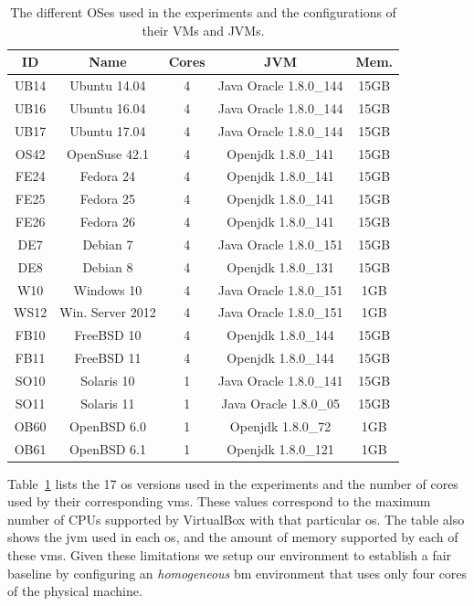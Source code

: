\begin{table}[h]
\begin{center}
{\footnotesize
\begin{tabular}{| c | c | c | c | c |}\hline
\textbf{ID} & \textbf{Name}  & \textbf{Cores} & \textbf{JVM} & \textbf{Mem.} \\\hline\hline
UB14 & Ubuntu 14.04 & 4 & Java Oracle 1.8.0\_144 & 15GB \\ \hline
UB16 & Ubuntu 16.04 & 4 & Java Oracle 1.8.0\_144 & 15GB \\ \hline
UB17 & Ubuntu 17.04 & 4 & Java Oracle 1.8.0\_144 & 15GB \\ \hline
OS42 & OpenSuse 42.1 & 4 & Openjdk 1.8.0\_141 & 15GB \\ \hline
FE24 & Fedora 24 & 4 & Openjdk 1.8.0\_141 & 15GB \\ \hline
FE25 & Fedora 25 & 4 & Openjdk 1.8.0\_141 & 15GB \\ \hline
FE26 & Fedora 26 & 4 & Openjdk 1.8.0\_141 & 15GB \\ \hline
DE7 & Debian 7 & 4 & Java Oracle 1.8.0\_151 & 15GB \\ \hline
DE8 & Debian 8 & 4 & Openjdk 1.8.0\_131 & 15GB \\ \hline
W10 & Windows 10 & 4 & Java Oracle 1.8.0\_151 &1GB \\ \hline
WS12 & Win. Server 2012 & 4 & Java Oracle 1.8.0\_151 & 1GB \\ \hline
FB10 & FreeBSD 10 & 4 & Openjdk 1.8.0\_144 & 15GB \\ \hline
FB11 & FreeBSD 11 & 4 & Openjdk 1.8.0\_144 & 15GB \\ \hline
SO10 & Solaris 10 & 1 & Java Oracle 1.8.0\_141 & 15GB \\ \hline
SO11 & Solaris 11 & 1 & Java Oracle 1.8.0\_05 & 15GB \\ \hline
OB60 & OpenBSD 6.0 & 1 & Openjdk 1.8.0\_72 & 1GB \\ \hline
OB61 & OpenBSD 6.1 & 1 & Openjdk 1.8.0\_121 & 1GB \\ \hline
\end{tabular}
}
\caption{The different OSes used in the experiments and the configurations of their VMs and JVMs.}
\label{tab:oses}
\end{center}
\end{table}

Table~\ref{tab:oses} lists the 17 \gls{os} versions used in the experiments and the number of cores used by their corresponding \glspl{vm}.
These values correspond to the maximum number of CPUs supported by VirtualBox with that particular \gls{os}.
The table also shows the \gls{jvm} used in each \gls{os}, and the amount of memory supported by each of these \glspl{vm}.
Given these limitations we setup our environment to establish a fair baseline by configuring an \emph{homogeneous} \gls{bm} environment that uses only four cores of the physical machine. 

